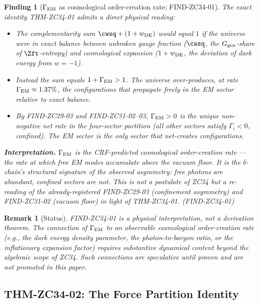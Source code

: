 \documentclass[12pt, a4paper]{article}
\newtheorem{remark}{Remark}[section]
\newtheorem{finding}{Finding}[section]
\begin{document}
\begin{finding}[$\Gamma_{\rm EM}$ as cosmological order-creation
  rate; FIND-ZC34-01]
\label{find:zc34-01}
The exact identity THM-ZC34-01 admits a direct physical reading:
\begin{itemize}[leftmargin=*, noitemsep]
  \item The complementarity sum
    $\cwsq + (1+w_{\rm DE})$ would equal $1$ if the universe
    were in exact balance between unbroken gauge fraction
    ($\cwsq$, the $G_{\rm gen}$-share of $\Zft$-entropy) and
    cosmological expansion ($1+w_{\rm DE}$, the deviation
    of dark energy from $w = -1$).
  \item Instead the sum equals $1 + \Gamma_{\rm EM} > 1$. The
    universe over-produces, at rate $\Gamma_{\rm EM} \approx
    1.37\%$, the configurations that propagate freely in the
    EM sector relative to exact balance.
  \item By FIND-ZC29-03 and FIND-ZC31-02--03,
    $\Gamma_{\rm EM} > 0$ is the unique non-negative net rate
    in the four-sector partition (all other sectors satisfy
    $\Gamma_i < 0$, confined). The EM sector is the
    \emph{only} sector that net-creates configurations.
\end{itemize}

\medskip
\textbf{Interpretation.} $\Gamma_{\rm EM}$ is the CRF-predicted
\emph{cosmological order-creation rate} --- the rate at which
free EM modes accumulate above the vacuum floor. It is the
$\delta$-chain's structural signature of the observed
asymmetry: free photons are abundant, confined sectors are
not. This is not a postulate of ZC34 but a re-reading of the
already-registered FIND-ZC29-03 (confinement asymmetry) and
FIND-ZC31-02 (vacuum floor) in light of THM-ZC34-01.
\hfill\textup{(FIND-ZC34-01)}
\end{finding}

\begin{remark}[Status]
FIND-ZC34-01 is a physical interpretation, not a derivation
theorem. The connection of $\Gamma_{\rm EM}$ to an observable
cosmological order-creation rate (e.g., the dark energy
density parameter, the photon-to-baryon ratio, or the
inflationary expansion factor) requires substantive
dynamical content beyond the algebraic scope of ZC34. Such
connections are speculative until proven and are not promoted
in this paper.
\end{remark}

\subsection{THM-ZC34-02: The Force Partition Identity}
\label{sec:thm-02}
\end{document}
